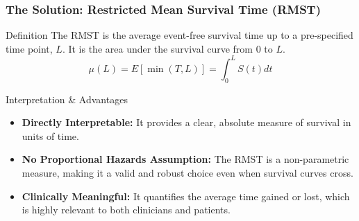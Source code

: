 \documentclass{beamer}
\begin{document}
\begin{frame}
\frametitle{The Solution: Restricted Mean Survival Time (RMST)}
\begin{block}{Definition}
The RMST is the average event-free survival time up to a pre-specified time point, $L$. It is the area under the survival curve from 0 to $L$.
$$\mu(L) = E[\min(T, L)] = \int_0^L S(t) dt$$
\end{block}

\begin{block}{Interpretation \& Advantages}
\begin{itemize}
    \item \textbf{Directly Interpretable:} It provides a clear, absolute measure of survival in units of time.
    \item \textbf{No Proportional Hazards Assumption:} The RMST is a non-parametric measure, making it a valid and robust choice even when survival curves cross.
    \item \textbf{Clinically Meaningful:} It quantifies the average time gained or lost, which is highly relevant to both clinicians and patients.
\end{itemize}
\end{block}

\end{frame}
\end{document}
